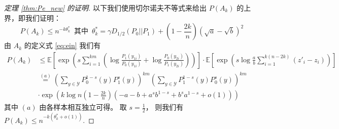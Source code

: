 \begin{proof}[定理 \ref{thm:Pe_new} 的证明]

以下我们使用切尔诺夫不等式来给出 $P(A_k)$
的上界，即我们证明：
$$
P(A_k) \leq n^{-k\theta^*_k} 
\,\textrm{ 其中 }\, \theta^*_k=\gamma D_{1/2}(P_0||P_1)
+\left(1-\frac{2k}{n} \right)\left(\sqrt{a}-\sqrt{b}
\right)^2
$$
由 $A_k$ 的定义式 \eqref{eq:ein} 我们有
\begin{align*}
P(A_k) &\leq \mathbb{E}
\left[\exp \left( s\sum_{i=1}^{km}
\left( \log \frac{P_1(y_{1i})}
    {P_0(y_{1i})}
+ \log \frac{P_0(y_{2i})}
    {P_1(y_{2i})} \right)
\right)\right]\cdot \mathbb{E}
\left[\exp\left(s\log \frac{a}{b}\sum_{i=1}^{k(n-2k)} (z'_i - z_i )\right)
\right] \\
& \stackrel{(a)}{=}
\left(\sum_{y\in \mathcal{Y}}
P_0^{1-s}(y)P_1^{s}(y)\right)^{km}
\left(\sum_{y\in \mathcal{Y}} P_1^{1-s}(y) P_0^{s}(y)
\right)^{km}\\
&   \cdot \exp\left(
    k\log n \left(1-\frac{2k}{n} \right)
    (-a-b+a^sb^{1-s}+b^sa^{1-s} +o(1)) 
    \right)
\end{align*}
其中 $(a)$ 由各样本相互独立可得。 取 $s=\frac{1}{2}$，
则我们有
$P(A_k) \leq  n^{-k(\theta^*_k+o(1))}$.


\end{proof}
